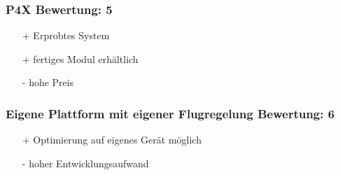 \subsubsection{P4X \hfill Bewertung: 5}
\begin{itemize}
    \item[+] Erprobtes System
    \item[+] fertiges Modul erhältlich
    \item[-] hohe Preis
\end{itemize}

\subsubsection{Eigene Plattform mit eigener Flugregelung \hfill Bewertung: 6}
\begin{itemize}
    \item[+] Optimierung auf eigenes Gerät möglich
    \item[-] hoher Entwicklungsaufwand
\end{itemize}

